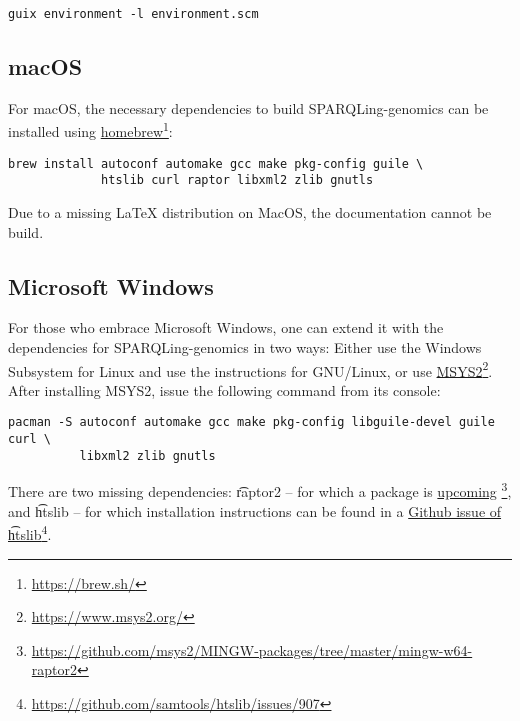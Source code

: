 \begin{siderules}
\begin{verbatim}
guix environment -l environment.scm
\end{verbatim}
\end{siderules}

\subsection{macOS}

  For macOS, the necessary dependencies to build SPARQLing-genomics
  can be installed using
  \href{https://brew.sh/}{homebrew}\footnote{\url{https://brew.sh/}}:

\begin{siderules}
\begin{verbatim}
brew install autoconf automake gcc make pkg-config guile \
             htslib curl raptor libxml2 zlib gnutls
\end{verbatim}
\end{siderules}

  Due to a missing \LaTeX{} distribution on MacOS, the documentation
  cannot be build.

\subsection{Microsoft Windows}

  For those who embrace Microsoft Windows, one can extend it with the
  dependencies for SPARQLing-genomics in two ways: Either use the Windows
  Subsystem for Linux and use the instructions for GNU/Linux, or use
  \href{https://www.msys2.org/}{MSYS2}\footnote{\url{https://www.msys2.org/}}.
  After installing MSYS2, issue the following command from its console:

\begin{siderules}
\begin{verbatim}
pacman -S autoconf automake gcc make pkg-config libguile-devel guile curl \
          libxml2 zlib gnutls
\end{verbatim}
\end{siderules}

  There are two missing dependencies: \t{raptor2} -- for which a package is
  \href{https://github.com/msys2/MINGW-packages/tree/master/mingw-w64-raptor2}{upcoming}%
  \footnote{\url{https://github.com/msys2/MINGW-packages/tree/master/mingw-w64-raptor2}},
  and \t{htslib} -- for which installation instructions can be found in a
  \href{https://github.com/samtools/htslib/issues/907}{Github issue of
    \t{htslib}}\footnote{\url{https://github.com/samtools/htslib/issues/907}}.

